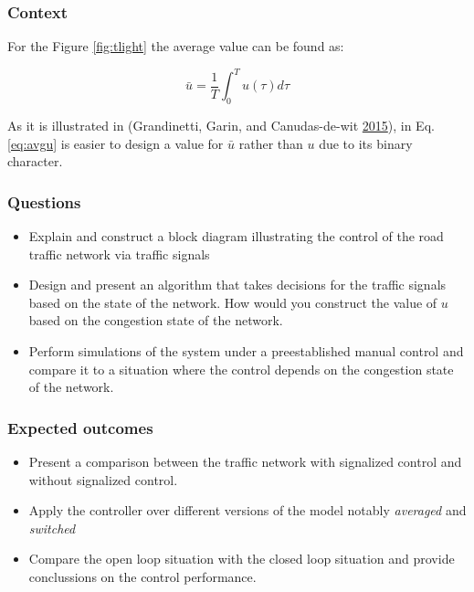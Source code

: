 \documentclass[]{book}
\theoremstyle{definition}
\theoremstyle{definition}
\theoremstyle{definition}
\theoremstyle{remark}
\begin{document}
\hypertarget{context-3}{%
\subsubsection*{Context}\label{context-3}}

For the Figure \ref{fig:tlight} the average value can be found as:

\begin{equation}
\bar{u} = \frac{1}{T}\int_0^T u(\tau) d\tau \label{eq:avgu}
\end{equation}

As it is illustrated in (Grandinetti, Garin, and Canudas-de-wit
\protect\hyperlink{ref-Grandinetti2016}{2015}), in Eq. \eqref{eq:avgu} is
easier to design a value for \(\bar{u}\) rather than \(u\) due to its
binary character.

\hypertarget{questions-2}{%
\subsubsection*{Questions}\label{questions-2}}

\begin{itemize}
\item
  Explain and construct a block diagram illustrating the control of the
  road traffic network via traffic signals
\item
  Design and present an algorithm that takes decisions for the traffic
  signals based on the state of the network. How would you construct the
  value of \(u\) based on the congestion state of the network.
\item
  Perform simulations of the system under a preestablished manual
  control and compare it to a situation where the control depends on the
  congestion state of the network.
\end{itemize}

\hypertarget{expected-outcomes-2}{%
\subsubsection*{Expected outcomes}\label{expected-outcomes-2}}

\begin{itemize}
\item
  Present a comparison between the traffic network with signalized
  control and without signalized control.
\item
  Apply the controller over different versions of the model notably
  \emph{averaged} and \emph{switched}
\item
  Compare the open loop situation with the closed loop situation and
  provide conclussions on the control performance.
\end{itemize}
\end{document}
